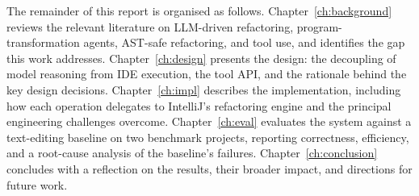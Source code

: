 The remainder of this report is organised as follows.
Chapter~\ref{ch:background} reviews the relevant literature on LLM-driven
refactoring, program-transformation agents, AST-safe refactoring, and tool use,
and identifies the gap this work addresses.
Chapter~\ref{ch:design} presents the design: the decoupling of model reasoning
from IDE execution, the tool API, and the rationale behind the key design
decisions.
Chapter~\ref{ch:impl} describes the implementation, including how each operation
delegates to IntelliJ's refactoring engine and the principal engineering
challenges overcome.
Chapter~\ref{ch:eval} evaluates the system against a text-editing baseline on
two benchmark projects, reporting correctness, efficiency, and a root-cause
analysis of the baseline's failures.
Chapter~\ref{ch:conclusion} concludes with a reflection on the results, their
broader impact, and directions for future work.
